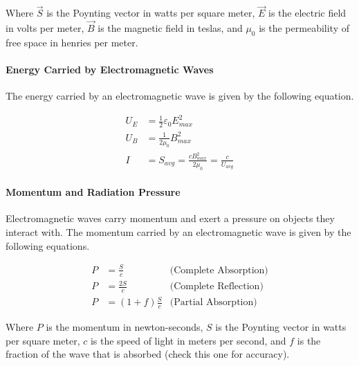 Where $\vec{S}$ is the Poynting vector in watts per square meter, $\vec{E}$ is the electric field in volts per meter, $\vec{B}$ is the magnetic field in teslas,
and $\mu_0$ is the permeability of free space in henries per meter.


\paragraph{Energy Carried by Electromagnetic Waves}
The energy carried by an electromagnetic wave is given by the following equation.

\begin{align*}
    U_E &= \frac{1}{2}\varepsilon_0E_{max}^2\\
    U_B &= \frac{1}{2\mu_0}B_{max}^2\\
    I &= S_{avg} = \frac{cB_{max}^2}{2\mu_0} = \frac{c}{U_{avg}}
\end{align*}

\paragraph{Momentum and Radiation Pressure}
Electromagnetic waves carry momentum and exert a pressure on objects they interact with. The momentum carried by an electromagnetic wave is given by the following 
equations.

\begin{align*}
    P &= \frac{S}{c} &\text{(Complete Absorption)}\\
    P &= \frac{2S}{c} &\text{(Complete Reflection)}\\
    P &= (1 + f) \frac{S}{c} &\text{(Partial Absorption)}
\end{align*}

Where $P$ is the momentum in newton-seconds, $S$ is the Poynting vector in watts per square meter, $c$ is the speed of light in meters per second, 
and $f$ is the fraction of the wave that is absorbed (check this one for accuracy).

